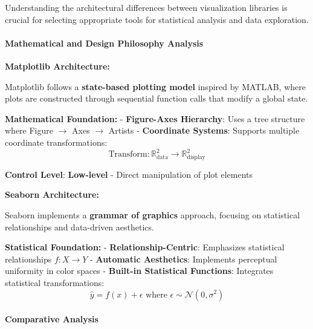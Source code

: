 \documentclass[11pt]{article}
\begin{document}
Understanding the architectural differences between visualization
libraries is crucial for selecting appropriate tools for statistical
analysis and data exploration.

\paragraph{Mathematical and Design Philosophy
Analysis}\label{mathematical-and-design-philosophy-analysis}

\textbf{Matplotlib Architecture:}

Matplotlib follows a \textbf{state-based plotting model} inspired by
MATLAB, where plots are constructed through sequential function calls
that modify a global state.

\textbf{Mathematical Foundation:} - \textbf{Figure-Axes Hierarchy}: Uses
a tree structure where Figure \(\rightarrow\) Axes \(\rightarrow\)
Artists - \textbf{Coordinate Systems}: Supports multiple coordinate
transformations:
\[\text{Transform}: \mathbb{R}^2_{\text{data}} \rightarrow \mathbb{R}^2_{\text{display}}\]

\textbf{Control Level}: \textbf{Low-level} - Direct manipulation of plot
elements

\textbf{Seaborn Architecture:}

Seaborn implements a \textbf{grammar of graphics} approach, focusing on
statistical relationships and data-driven aesthetics.

\textbf{Statistical Foundation:} - \textbf{Relationship-Centric}:
Emphasizes statistical relationships \(f: X \rightarrow Y\) -
\textbf{Automatic Aesthetics}: Implements perceptual uniformity in color
spaces - \textbf{Built-in Statistical Functions}: Integrates statistical
transformations:
\[\hat{y} = f(x) + \epsilon \text{ where } \epsilon \sim \mathcal{N}(0, \sigma^2)\]

\paragraph{Comparative Analysis}\label{comparative-analysis}
\end{document}
